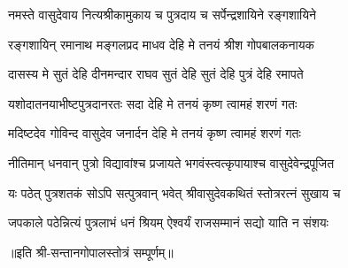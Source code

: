 \twolineshloka
{नमस्ते वासुदेवाय नित्यश्रीकामुकाय च}
{पुत्रदाय च सर्पेन्द्रशायिने रङ्गशायिने}%

\twolineshloka
{रङ्गशायिन् रमानाथ मङ्गलप्रद माधव}
{देहि मे तनयं श्रीश गोपबालकनायक}%

\twolineshloka
{दासस्य मे सुतं देहि दीनमन्दार राघव}
{सुतं देहि सुतं देहि पुत्रं देहि रमापते}%

\twolineshloka
{यशोदातनयाभीष्टपुत्रदानरतः सदा}
{देहि मे तनयं कृष्ण त्वामहं शरणं गतः}%

\twolineshloka
{मदिष्टदेव गोविन्द वासुदेव जनार्दन}
{देहि मे तनयं कृष्ण त्वामहं शरणं गतः}%

\twolineshloka
{नीतिमान् धनवान् पुत्रो विद्यावांश्च प्रजायते}
{भगवंस्त्वत्कृपायाश्च वासुदेवेन्द्रपूजित}%

\twolineshloka
{यः पठेत् पुत्रशतकं सोऽपि सत्पुत्रवान् भवेत्}
{श्रीवासुदेवकथितं स्तोत्ररत्नं सुखाय च}%

\twolineshloka
{जपकाले पठेन्नित्यं पुत्रलाभं धनं श्रियम्}
{ऐश्वर्यं राजसम्मानं सद्यो याति न संशयः}%

{॥इति श्री-सन्तानगोपालस्तोत्रं सम्पूर्णम्॥}